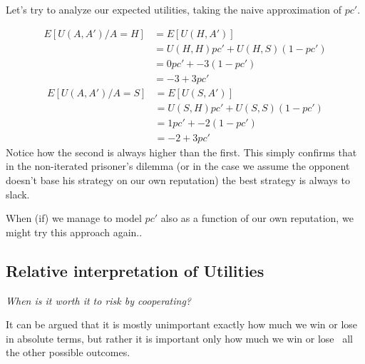 \documentclass[10pt,fleqn]{article}
\begin{document}
Let's try to analyze our expected utilities, taking the naive approximation of
$pc'$.

\begin{align*}
  E[U(A, A') / A = H] &= E[U(H, A')] \\
                      &= U(H, H) pc' + U(H, S) (1-pc')\\
                      &= 0 pc' + -3 (1-pc') \\
                      &= -3 + 3 pc'
\end{align*}
\begin{align*}
  E[U(A, A') / A = S] &= E[U(S, A')] \\
                      &= U(S, H) pc' + U(S, S) (1-pc') \\
                      &= 1 pc' + -2 (1-pc') \\
                      &= -2 + 3 pc'
\end{align*}
Notice how the second is always higher than the first. This simply confirms that
in the non-iterated prisoner's dilemma (or in the case we assume the opponent
doesn't base his strategy on our own reputation) the best strategy is always to
slack.

When (if) we manage to model $pc'$ also as a function of our own reputation, we
might try this approach again..

\subsection{Relative interpretation of Utilities}
\emph{When is it worth it to risk by cooperating?}

It can be argued that it is mostly unimportant exactly how much we win or lose
in absolute terms, but rather it is important only how much we win or lose \wrt\
all the other possible outcomes.
\end{document}
